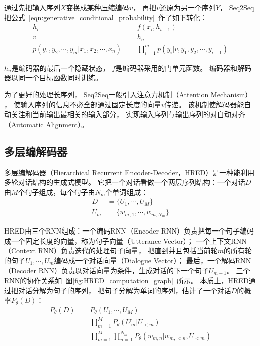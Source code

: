 通过先把输入序列$X$变换成某种压缩编码$v$，
再把$v$还原为另一个序列$Y$，
Seq2Seq把公式~\ref{eqn:generative_conditional_probability}~作了如下转化：
\begin{align}
    h_i &= f(x_i ,h_{i-1}) \\
    v &= h_n \\
    p(y_1, y_2, \cdots, y_m|x_1, x_2, \cdots, x_n) &=
    \prod_{i=1}^m p(y_i|v, y_1, y_2, \cdots, y_{i-1})
\end{align}

$h_n$是编码器的最后一个隐藏状态， $f$是编码器采用的门单元函数。
编码器和解码器以同一个目标函数同时训练。

为了更好的处理长序列，
Seq2Seq一般引入注意力机制（Attention Mechanism）
，
使输入序列的信息不必全部通过固定长度的向量$v$传递。
该机制使解码器能自动关注和当前输出最相关的输入部分，
实现输入序列与输出序列的对自动对齐（Automatic Alignment）。


\subsection{多层编解码器}\label{subsec:hierarchical_rnn}
多层编解码器（Hierarchical Recurrent Encoder-Decoder，HRED）是一种能利用多轮对话结构的生成式模型。
它把一个对话看做一个两层序列结构：一个对话$D$由$M$个句子组成，每个句子由$N_m$个单词组成：
\begin{align}
    D &= \{ U_1, \cdots, U_M \} \\
    U_m &= \{ w_{m, 1}, \cdots, w_{m, N_m} \}
\end{align}

HRED由三个RNN组成：一个编码RNN（Encoder RNN）负责把每一个句子编码成一个固定长度的向量，称为句子向量（Utterance Vector）；
一个上下文RNN（Context RNN）负责迭代的处理句子向量，
把直到并且包括当前轮$m$的所有轮的句子$U_1, \cdots, U_m$编码成一个对话向量（Dialogue Vector）；
最后，一个解码RNN（Decoder RNN）负责以对话向量为条件，生成对话的下一个句子$U_{m+1}$。
三个RNN的协作关系如~图\ref{fig:HRED_computation_graph}~所示。
本质上，HRED通过把对话分解为句子的序列，
把句子分解为单词的序列，估计了一个对话$D$的概率$P_{\theta}(D)$：
\begin{align}
    P_{\theta}(D) &= P_{\theta}(U_1, \cdots, U_M) \\
    &= \prod_{m=1}^M P_{\theta}(U_m|U_{<m}) \\
    &= \prod_{m=1}^M \prod_{n=1}^{N_m} P_{\theta}(
    w_{m, n} |w_{m, <n}, U_{<m}
    )
\end{align}

